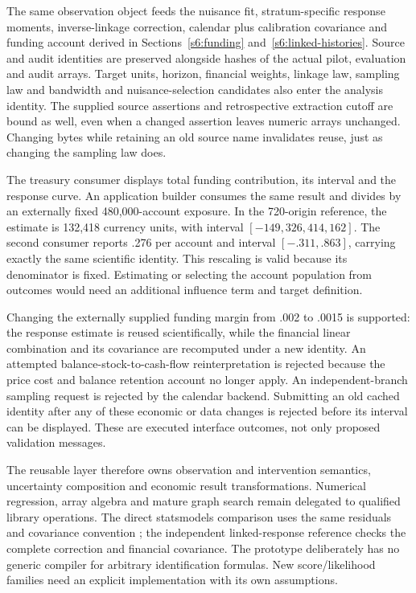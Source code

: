 The same observation object feeds the nuisance fit, stratum-specific response
moments, inverse-linkage correction, calendar plus calibration covariance
and funding account derived in Sections~\ref{s6:funding}
and~\ref{s6:linked-histories}. Source and audit identities are preserved
alongside hashes of the actual pilot, evaluation and audit arrays. Target
units, horizon, financial weights, linkage law, sampling law and bandwidth
and nuisance-selection candidates also enter the analysis identity. The
supplied source assertions and retrospective extraction cutoff are bound
as well, even when a changed assertion leaves numeric arrays unchanged.
Changing bytes while retaining an old
source name invalidates reuse, just as changing the sampling law does.

The treasury consumer displays total funding contribution, its interval
and the response curve. An application builder consumes the same result
and divides by an externally fixed 480,000-account exposure. In the
720-origin reference, the estimate is 132,418 currency units, with interval
$[-149{,}326,414{,}162]$. The second consumer reports .276 per account and
interval $[-.311,.863]$, carrying exactly the same scientific identity.
This rescaling is valid because its denominator is fixed. Estimating or
selecting the account population from outcomes would need an additional
influence term and target definition.

Changing the externally supplied funding margin from .002 to .0015 is
supported: the response estimate is reused scientifically, while the
financial linear combination and its covariance are recomputed under a
new identity. An attempted balance-stock-to-cash-flow reinterpretation is
rejected because the price cost and balance retention account no longer
apply. An independent-branch sampling request is rejected by the calendar
backend. Submitting an old cached identity after any of these economic or
data changes is rejected before its interval can be displayed. These are
executed interface outcomes, not only proposed validation messages.

The reusable layer therefore owns observation and intervention semantics,
uncertainty composition and economic result transformations. Numerical
regression, array algebra and mature graph search remain delegated to
qualified library operations. The direct statsmodels comparison uses the
same residuals and covariance convention \citep{runtime_statsmodels_dynamic};
the independent linked-response reference checks the complete correction
and financial covariance. The prototype deliberately has no generic
compiler for arbitrary identification formulas. New score/likelihood
families need an explicit implementation with its own assumptions.

